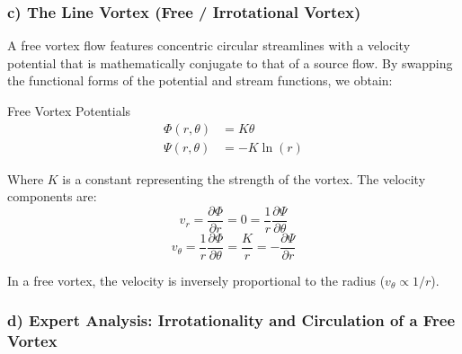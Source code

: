 \subsubsection{c) The Line Vortex (Free / Irrotational Vortex)}

A free vortex flow features concentric circular streamlines with a velocity potential that is mathematically conjugate to that of a source flow. By swapping the functional forms of the potential and stream functions, we obtain:

\begin{eqbox}{Free Vortex Potentials}
\begin{align*}
\Phi(r, \theta) &= K \theta \\
\Psi(r, \theta) &= -K \ln(r)
\end{align*}
\end{eqbox}

Where $K$ is a constant representing the strength of the vortex. The velocity components are:
$$v_r = \frac{\partial \Phi}{\partial r} = 0 = \frac{1}{r} \frac{\partial \Psi}{\partial \theta}$$
$$v_\theta = \frac{1}{r} \frac{\partial \Phi}{\partial \theta} = \frac{K}{r} = -\frac{\partial \Psi}{\partial r}$$

In a free vortex, the velocity is inversely proportional to the radius ($v_\theta \propto 1/r$).

\newpage
\subsubsection{d) Expert Analysis: Irrotationality and Circulation of a Free Vortex}

